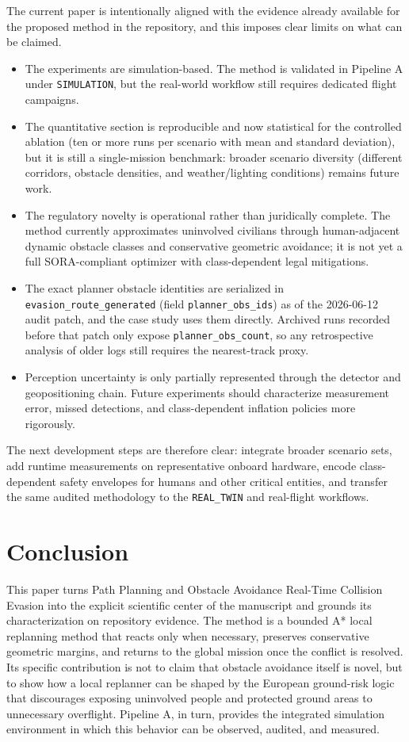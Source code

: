 \documentclass[a4paper,11pt]{article}
\begin{document}
The current paper is intentionally aligned with the evidence already available for the proposed method in the repository, and this imposes clear limits on what can be claimed.
\begin{itemize}[leftmargin=1.3em]
    \item The experiments are simulation-based. The method is validated in Pipeline A under \texttt{SIMULATION}, but the real-world workflow still requires dedicated flight campaigns.
    \item The quantitative section is reproducible and now statistical for the controlled ablation (ten or more runs per scenario with mean and standard deviation), but it is still a single-mission benchmark: broader scenario diversity (different corridors, obstacle densities, and weather/lighting conditions) remains future work.
    \item The regulatory novelty is operational rather than juridically complete. The method currently approximates uninvolved civilians through human-adjacent dynamic obstacle classes and conservative geometric avoidance; it is not yet a full SORA-compliant optimizer with class-dependent legal mitigations.
    \item The exact planner obstacle identities are serialized in \texttt{evasion\_route\_generated} (field \texttt{planner\_obs\_ids}) as of the 2026-06-12 audit patch, and the case study uses them directly. Archived runs recorded before that patch only expose \texttt{planner\_obs\_count}, so any retrospective analysis of older logs still requires the nearest-track proxy.
    \item Perception uncertainty is only partially represented through the detector and geopositioning chain. Future experiments should characterize measurement error, missed detections, and class-dependent inflation policies more rigorously.
\end{itemize}

The next development steps are therefore clear: integrate broader scenario sets, add runtime measurements on representative onboard hardware, encode class-dependent safety envelopes for humans and other critical entities, and transfer the same audited methodology to the \texttt{REAL\_TWIN} and real-flight workflows.

\section{Conclusion}

This paper turns Path Planning and Obstacle Avoidance Real-Time Collision Evasion into the explicit scientific center of the manuscript and grounds its characterization on repository evidence. The method is a bounded A* local replanning method that reacts only when necessary, preserves conservative geometric margins, and returns to the global mission once the conflict is resolved. Its specific contribution is not to claim that obstacle avoidance itself is novel, but to show how a local replanner can be shaped by the European ground-risk logic that discourages exposing uninvolved people and protected ground areas to unnecessary overflight. Pipeline A, in turn, provides the integrated simulation environment in which this behavior can be observed, audited, and measured.
\end{document}
